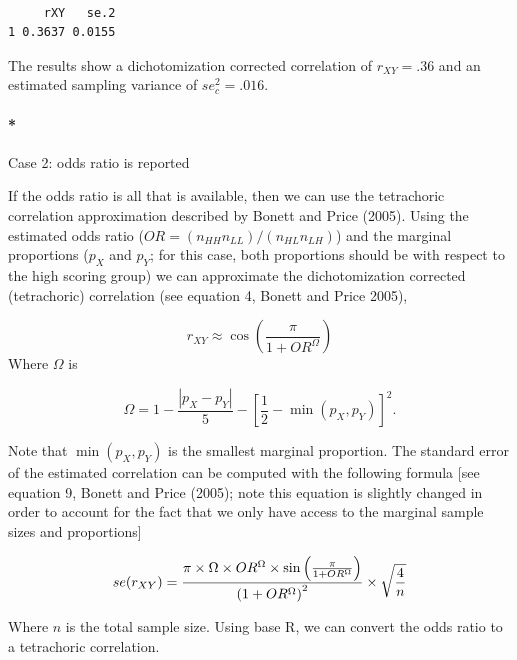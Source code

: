 \documentclass[
  letterpaper,
  DIV=11,
  numbers=noendperiod]{scrreprt}
\let\oldparagraph\paragraph
\renewcommand{\paragraph}[1]{\oldparagraph{#1}\mbox{}}
\begin{document}
\begin{verbatim}

     rXY   se.2 
1 0.3637 0.0155 
\end{verbatim}

The results show a dichotomization corrected correlation of
\(r_{XY} = .36\) and an estimated sampling variance of \(se_c^2=.016\).

\hypertarget{case-2-odds-ratio-is-reported}{%
\paragraph*{Case 2: odds ratio is
reported}\label{case-2-odds-ratio-is-reported}}

If the odds ratio is all that is available, then we can use the
tetrachoric correlation approximation described by Bonett and Price
(2005). Using the estimated odds ratio
(\(OR=(n_{HH}n_{LL})/(n_{HL}n_{LH})\)) and the marginal proportions
(\(p_X\) and \(p_Y\); for this case, both proportions should be with
respect to the high scoring group) we can approximate the
dichotomization corrected (tetrachoric) correlation (see equation 4,
Bonett and Price 2005),

\[
r_{XY} \approx \cos\left( \frac{\pi}{1+OR^\Omega}\right)
\] Where \(\Omega\) is

\[
\Omega = 1 - \frac{\left|p_X -p_Y\right|}{5} - \left[\frac{1}{2}-\min(p_X,p_Y)\right]^2.
\]

Note that \(\min(p_X,p_Y)\) is the smallest marginal proportion. The
standard error of the estimated correlation can be computed with the
following formula {[}see equation 9, Bonett and Price (2005); note this
equation is slightly changed in order to account for the fact that we
only have access to the marginal sample sizes and proportions{]}

\[
\small{se(r_{XY}) =  \frac{\pi\times \Omega\times OR^\Omega\times\sin\left(\frac{\pi}{1+OR^\Omega}\right)}{\left(1+OR^\Omega\right)^2}\times\sqrt{\frac{4}{n}}}
\]

Where \(n\) is the total sample size. Using base R, we can convert the
odds ratio to a tetrachoric correlation.
\end{document}
